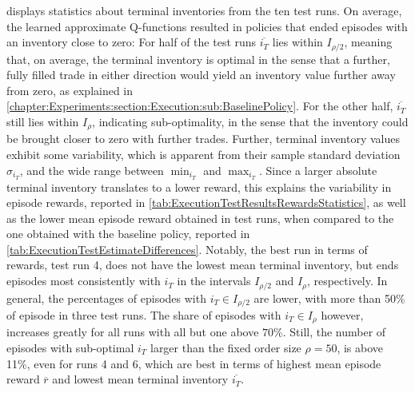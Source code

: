 \documentclass[
    a4paper,
    11pt,
    bibliography=totoc,
    listof=totoc,      
    headinclude=true,
    cleardoublepage=empty,
]{scrbook}
\theoremstyle{plain}
\theoremstyle{definition}
\theoremstyle{remark}
\begin{document}
 displays statistics about 
terminal inventories from the ten test runs. On average, the learned 
approximate Q-functions resulted in policies that ended episodes with an 
inventory close to zero: 
For half of the test runs $\overline{i_T}$ lies within $I_{\rho/2}$, meaning 
that, on average, the terminal inventory is optimal in the sense that a 
further, fully filled trade in either direction would yield an inventory value 
further away from zero, as explained in
\cref{chapter:Experiments:section:Execution:sub:BaselinePolicy}. For the other 
half, $\overline{i_T}$ still lies within $I_\rho$, indicating sub-optimality, 
in the sense that the inventory could be brought closer to zero with further 
trades. 
%
Further, terminal inventory values exhibit some variability, which is apparent 
from their sample standard deviation $\sigma_{i_T}$, and the wide range 
between $\min_{i_T}$ and $\max_{i_T}$. Since a larger absolute terminal 
inventory translates to a lower reward, this explains the variability in 
episode rewards, reported in \cref{tab:ExecutionTestResultsRewardsStatistics}, 
as well as the lower mean episode reward obtained in test runs, when compared 
to the one obtained with the baseline policy, reported in 
\cref{tab:ExecutionTestEstimateDifferences}.
%
Notably, the best run in terms of rewards, test run 4, does not have the 
lowest mean terminal inventory, but ends episodes most consistently with $i_T$ 
in the intervals $I_{\rho/2}$ and $I_\rho$, respectively. In general, the 
percentages of episodes with $i_T\in I_{\rho/2}$ are lower, with more than 
50\% of episode in three test runs. The share of episodes with $i_T\in I_\rho$ 
however, increases greatly for all runs with all but one above $70\%$. Still, 
the number of episodes with sub-optimal $i_T$ larger than the fixed order size 
$\rho=50$, is above 11\%, even for runs 4 and 6, which are best in terms of 
highest mean episode reward $\overline r$ and lowest mean terminal inventory 
$\overline {i_T}$.
\end{document}
